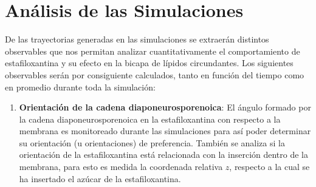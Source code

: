 \section{An\'{a}lisis de las Simulaciones}

De las trayectorias generadas en las simulaciones se extraer\'{a}n distintos observables que nos permitan analizar cuantitativamente el comportamiento de estafiloxantina y su efecto en la bicapa de l\'{i}pidos circundantes. Los siguientes observables ser\'{a}n por consiguiente calculados, tanto en funci\'{o}n del tiempo como en promedio durante toda la simulaci\'{o}n:\\
\begin{enumerate}
\item \textbf{Orientaci\'{o}n de la cadena diaponeurosporenoica}: El \'{a}ngulo formado por la cadena diaponeurosporenoica en la estafiloxantina con respecto a la membrana es monitoreado durante las simulaciones para as\'{i} poder determinar su orientaci\'{o}n (u orientaciones) de preferencia. Tambi\'{e}n se analiza si la orientaci\'{o}n de la estafiloxantina est\'{a} relacionada con la inserci\'{o}n dentro de la membrana, para esto es medida la coordenada relativa $z$, respecto a la cual se ha insertado el az\'{u}car de la estafiloxantina.\\


\end{enumerate}
